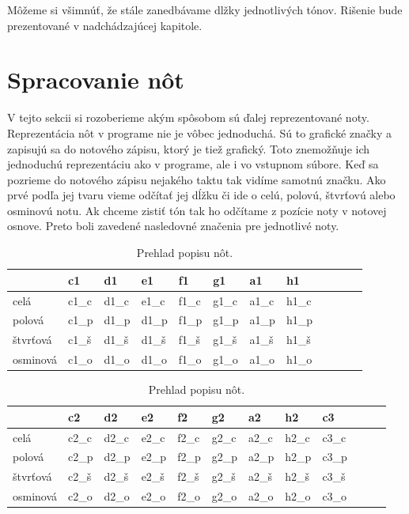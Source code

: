 Môžeme si všimnúť, že stále zanedbávame dlžky jednotlivých tónov. Rišenie bude prezentované v nadchádzajúcej kapitole.

\section{Spracovanie nôt}
V tejto sekcii si rozoberieme akým spôsobom sú ďalej reprezentované noty. Reprezentácia nôt v programe nie je vôbec jednoduchá. Sú to grafické značky a zapisujú sa do notového zápisu, ktorý je tiež grafický. Toto znemožňuje ich jednoduchú reprezentáciu ako v programe, ale i vo vstupnom súbore. Keď sa pozrieme do notového zápisu nejakého taktu tak vidíme samotnú značku. Ako prvé podľa jej tvaru vieme odčítať jej dĺžku či ide o celú, polovú, štvrťovú alebo osminovú notu. Ak chceme zistiť tón tak ho odčítame z pozície noty v notovej osnove. Preto boli zavedené nasledovné značenia pre jednotlivé noty.

\begin{table}[!ht]
    \centering
    \begin{tabular}{|l|l|l|l|l|l|l|l|l|l|l|l}
    \hline
        ~ & c1 & d1 & e1 & f1 & g1 & a1 & h1 \\ \hline
        celá & c1\_c & d1\_c & e1\_c & f1\_c & g1\_c & a1\_c & h1\_c \\ \hline
        polová & c1\_p & d1\_p & d1\_p & f1\_p & g1\_p & a1\_p & h1\_p \\ \hline
        štvrťová & c1\_š & d1\_š & d1\_š & f1\_š & g1\_š & a1\_š & h1\_š \\ \hline
        osminová & c1\_o & d1\_o & d1\_o & f1\_o & g1\_o & a1\_o & h1\_o  \\ \hline
    \end{tabular}
    \caption{\label{tab:notes} Prehlad popisu nôt.}
\end{table}
\begin{table}[!ht]
    \centering
    \begin{tabular}{|l|l|l|l|l|l|l|l|l|l|l|l}
    \hline
        ~ & c2 & d2 & e2 & f2 & g2 & a2 & h2 & c3 \\ \hline
        celá & c2\_c & d2\_c & e2\_c & f2\_c & g2\_c & a2\_c & h2\_c & c3\_c \\ \hline
        polová & c2\_p & d2\_p & e2\_p & f2\_p & g2\_p & a2\_p & h2\_p & c3\_p \\ \hline
        štvrťová & c2\_š & d2\_š & e2\_š & f2\_š & g2\_š & a2\_š & h2\_š & c3\_š \\ \hline
        osminová & c2\_o & d2\_o & e2\_o & f2\_o & g2\_o & a2\_o & h2\_o & c3\_o \\ \hline
    \end{tabular}
    \caption{\label{tab:notes1} Prehlad popisu nôt.}
\end{table}

